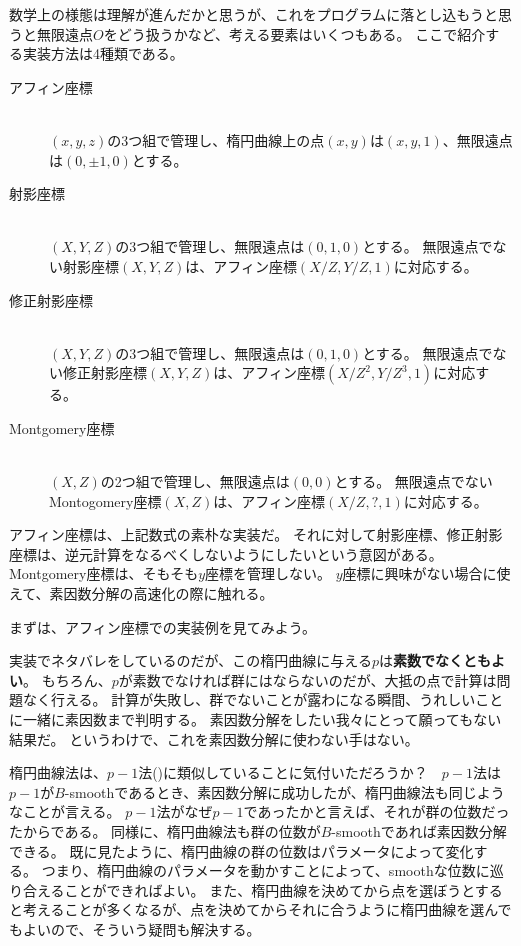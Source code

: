 数学上の様態は理解が進んだかと思うが、これをプログラムに落とし込もうと思うと無限遠点$O$をどう扱うかなど、考える要素はいくつもある。
ここで紹介する実装方法は4種類である。
\begin{description}
 \item [アフィン座標]\mbox{}\\
       $(x,y,z)$の3つ組で管理し、楕円曲線上の点$(x,y)$は$(x,y,1)$、無限遠点は$(0,\pm1,0)$とする。
 \item [射影座標]\mbox{}\\
       $(X,Y,Z)$の3つ組で管理し、無限遠点は$(0,1,0)$とする。
       無限遠点でない射影座標$(X,Y,Z)$は、アフィン座標$(X/Z,Y/Z,1)$に対応する。
 \item [修正射影座標]\mbox{}\\
       $(X,Y,Z)$の3つ組で管理し、無限遠点は$(0,1,0)$とする。
       無限遠点でない修正射影座標$(X,Y,Z)$は、アフィン座標$(X/Z^2,Y/Z^3,1)$に対応する。
 \item [Montgomery座標]\mbox{}\\
       $(X,Z)$の2つ組で管理し、無限遠点は$(0,0)$とする。
       無限遠点でないMontogomery座標$(X,Z)$は、アフィン座標$(X/Z,?,1)$に対応する。
\end{description}
アフィン座標は、上記数式の素朴な実装だ。
それに対して射影座標、修正射影座標は、逆元計算をなるべくしないようにしたいという意図がある。
Montgomery座標は、そもそも$y$座標を管理しない。
$y$座標に興味がない場合に使えて、素因数分解の高速化の際に触れる。

まずは、アフィン座標での実装例を見てみよう。


実装でネタバレをしているのだが、この楕円曲線に与える$p$は\textbf{素数でなくともよい}。
もちろん、$p$が素数でなければ群にはならないのだが、大抵の点で計算は問題なく行える。
計算が失敗し、群でないことが露わになる瞬間、うれしいことに一緒に素因数まで判明する。
素因数分解をしたい我々にとって願ってもない結果だ。
というわけで、これを素因数分解に使わない手はない。


楕円曲線法は、$p-1$法()に類似していることに気付いただろうか？　$p-1$法は$p-1$が$B$-smoothであるとき、素因数分解に成功したが、楕円曲線法も同じようなことが言える。
$p-1$法がなぜ$p-1$であったかと言えば、それが群の位数だったからである。
同様に、楕円曲線法も群の位数が$B$-smoothであれば素因数分解できる。
既に見たように、楕円曲線の群の位数はパラメータによって変化する。
つまり、楕円曲線のパラメータを動かすことによって、smoothな位数に巡り合えることができればよい。
また、楕円曲線を決めてから点を選ぼうとすると考えることが多くなるが、点を決めてからそれに合うように楕円曲線を選んでもよいので、そういう疑問も解決する。

